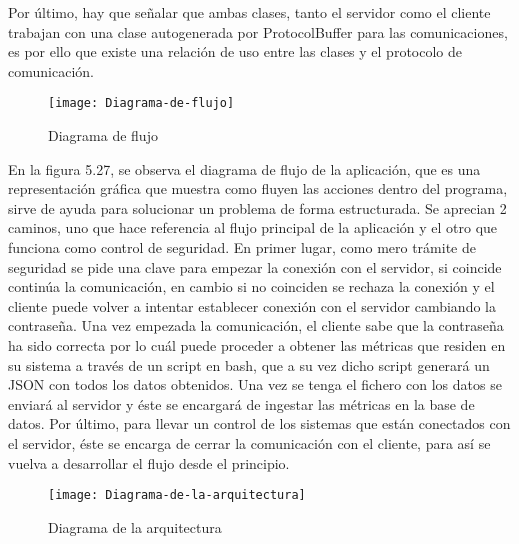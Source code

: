 \documentclass[ spanish, a4paper, 12pt, oneside]{report}
\begin{document}
Por último, hay que señalar que ambas clases, tanto el servidor como el cliente trabajan con una clase autogenerada por 
ProtocolBuffer para las comunicaciones, es por ello que existe una relación de uso entre las clases y el protocolo de comunicación. \\ 

\begin{figure}[!h]
   \centering
   \texttt{[image: Diagrama-de-flujo]}\\
      \caption{\label{fig: Diagrama de flujo} Diagrama de flujo}
\end{figure}

En la figura 5.27, se observa el diagrama de flujo de la aplicación, que es una representación gráfica que muestra como fluyen las acciones dentro del programa, sirve de ayuda para solucionar un problema de forma estructurada. Se aprecian 2 caminos, uno que hace referencia al flujo principal de la aplicación y el otro que funciona como 
control de seguridad. En primer lugar, como mero trámite de seguridad se pide una clave para empezar la conexión con el servidor, si coincide continúa la comunicación, en cambio si no coinciden se rechaza la conexión y el cliente puede volver a intentar establecer conexión con el servidor cambiando la contraseña. Una vez empezada la comunicación, 
el cliente sabe que la contraseña ha sido correcta por lo cuál puede proceder a obtener las métricas que residen en su sistema a través de un script en bash, que a su vez dicho script generará un JSON con todos los datos obtenidos. Una vez se tenga el fichero con los datos se enviará al servidor y éste se encargará de ingestar las métricas en la 
base de datos. Por último, para llevar un control de los sistemas que están conectados con el servidor, éste se encarga de cerrar la comunicación con el cliente, para así se vuelva a desarrollar el flujo desde el principio. \\

\begin{figure}[!h]
   \centering
   \texttt{[image: Diagrama-de-la-arquitectura]}\\
      \caption{\label{fig: Diagrama de la arquitectura} Diagrama de la arquitectura}
\end{figure}
\end{document}
